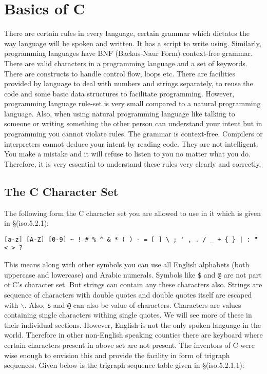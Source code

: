 \chapter{Basics of C}
There are certain rules in every language, certain grammar which
dictates the
way language will be spoken and written. It has a script to write
using. Similarly, programming languages have BNF (Backus-Naur Form)
context-free grammar. There are valid characters in a programming language and
a set of keywords. There are constructs to handle control flow, loops
etc. There are facilities provided by language to deal with numbers and strings
separately, to reuse the code and some basic data structures to facilitate
programming. However, programming language rule-set is very small compared
to a natural programming language. Also, when using natural programming
language like talking to someone or writing something the other person can
understand your intent but in programming you cannot violate rules. The grammar
is context-free. Compilers or interpreters cannot deduce your intent by reading
code. They are not intelligent. You make a mistake and it will refuse to listen
to you no matter what you do. Therefore, it is very essential to understand
these rules very clearly and correctly.

\section{The C Character Set}
The following form the C character set you are allowed to use in it which is
given in \S(iso.5.2.1):

\begin{Verbatim}[frame=single]
[a-z] [A-Z] [0-9] ~ ! # % ^ & * ( ) - = [ ] \ ; ' , . / _ + { } | : " < > ?
\end{Verbatim}

This means along with other symbols you can use all English alphabets (both
uppercase and lowercase) and Arabic numerals. Symbols like \texttt{\$} and
\texttt{@} are not part of C's character set. But strings can contain any
these characters also. Strings are sequence of characters with double quotes
and double quotes itself are escaped with \texttt{$\backslash$}. Also,
\texttt{\$} and \texttt{@} can also be value of characters. Characters are
values containing single characters withing single quotes. We will see more of
these in their individual sections. However, English is not the only
spoken language in the world. Therefore in other non-English speaking counties
there are keyboard where certain characters present in above set are not
present. The inventors of C were wise enough to envision this and provide the
facility in form of trigraph sequences. Given below is the trigraph sequence
table given in \S(iso.5.2.1.1):

